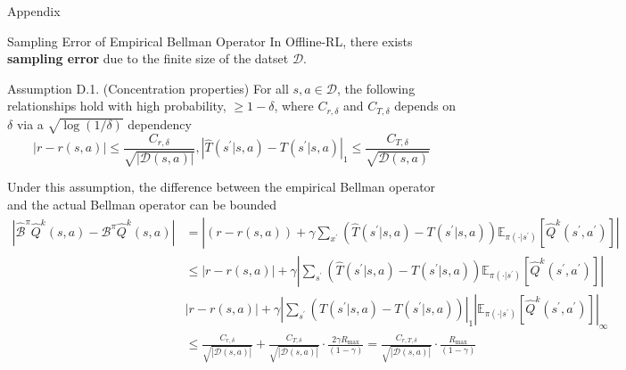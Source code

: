 \documentclass[11pt]{beamer}
\newcommand{\mbb}[1]{\mathbb{#1}}
\newcommand{\mc}[1]{\mathcal{#1}}
\newcommand{\tb}[1]{\textbf{#1}}
\newcommand{\abs}[1]{\left\lvert #1 \right\rvert}
\begin{document}
\begin{frame}{Appendix}
  \begin{block}{Sampling Error of Empirical Bellman Operator} \label{appendix:sampling_error}
    In Offline-RL, there exists \tb{sampling error} due to the finite size of the datset $\mc{D}$.

    \begin{block}{Assumption D.1. (Concentration properties)}
      For all $s,a \in \mc{D}$, the following relationships hold with high probability, $\geq 1-\delta$, where $C_{r,\delta}$ and $C_{T,\delta}$ depends on $\delta$ via a $\sqrt{\log(1/\delta)}$ dependency
      \[
        \abs{r - r(s,a)} \leq \frac{C_{r,\delta}}{\sqrt{\abs{\mc{D}(s,a)}}}, \abs{\hat{T}(s^\prime|s,a) - T(s^\prime |s,a)}_1 \leq \frac{C_{T,\delta}}{\sqrt{\mc{D}(s,a)}}
      \]
    \end{block}
    Under this assumption, the difference between the empirical Bellman operator and the actual Bellman operator can be bounded
    \[
      \begin{aligned}
        \abs{\hat{\mc{B}}^\pi \hat{Q}^k (s,a) - \mc{B}^\pi \hat{Q}^k (s,a)} &= \abs{ (r - r(s,a)) + \gamma \sum_{x^\prime} \left(\hat{T}(s^\prime|s,a) - T(s^\prime |s,a)\right)\mbb{E}_{\pi(\cdot | s^\prime)}\left[ \hat{Q}^k (s^\prime, a^\prime)\right]} \\
        & \leq \abs{r - r(s,a)} + \gamma \abs{\sum_{s^\prime} \left(\hat{T}(s^\prime |s,a) - T(s^\prime |s,a)\right)\mbb{E}_{\pi(\cdot | s^\prime)}\left[\hat{Q}^k (s^\prime, a^\prime)\right]} \\
        &\abs{r - r(s,a)} + \gamma \abs{\sum_{s^\prime} \left(\hat{T}(s^\prime|s,a) - T(s^\prime|s,a)\right)}_1 \abs{\mbb{E}_{\pi(\cdot | s^\prime)}\left[\hat{Q}^k(s^\prime, a^\prime)\right]}_\infty \\
        &\leq \frac{C_{r,\delta}}{\sqrt{\abs{\mc{D}(s,a)}}} + \frac{C_{T,\delta}}{\sqrt{\abs{\mc{D}(s,a)}}} \cdot \frac{2\gamma R_{\text{max}}}{(1-\gamma)} = \frac{C_{r,T,\delta}}{\sqrt{\abs{\mc{D}(s,a)}}} \cdot \frac{R_{\text{max}}}{(1-\gamma)}
      \end{aligned}
    \]
  \end{block}
\end{frame}
\end{document}
